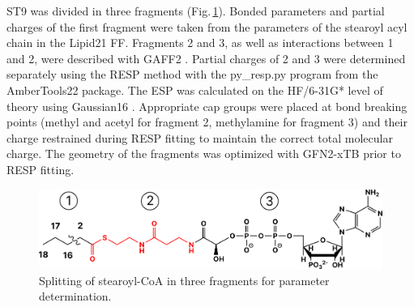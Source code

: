 ST9 was divided in three fragments (Fig.\,\ref{fig:ST9}). Bonded parameters and partial charges of the first fragment were taken from the parameters of the stearoyl acyl chain in the Lipid21 FF. Fragments 2 and 3, as well as interactions between 1 and 2, were described with GAFF2 \cite{He2020}. Partial charges of 2 and 3 were determined separately using the RESP method \cite{Bayly1993} with the py\_resp.py program from the AmberTools22 package. The ESP was calculated on the HF/6-31G* level of theory using Gaussian16 \cite{gaussian16}. Appropriate cap groups were placed at bond breaking points (methyl and acetyl for fragment 2, methylamine for fragment 3) and their charge restrained during RESP fitting to maintain the correct total molecular charge. The geometry of the fragments was optimized with GFN2-xTB prior to RESP fitting.
\begin{figure}[htbp]
    \centering
    \includegraphics[width=1.0 \textwidth]{Figures/ST9.pdf}
    \caption{Splitting of stearoyl-CoA in three fragments for parameter determination.}
    \label{fig:ST9}
\end{figure}

